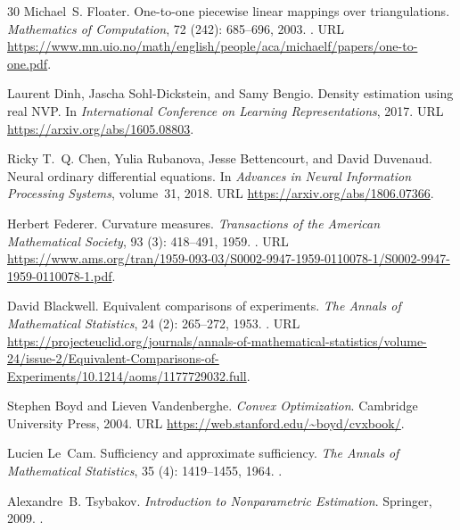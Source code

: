 \documentclass[11pt,a4paper]{article}
\numberwithin{equation}{section}
\theoremstyle{definition}
\begin{document}
\begin{thebibliography}{30}
Michael~S. Floater.
\newblock One-to-one piecewise linear mappings over triangulations.
\newblock \emph{Mathematics of Computation}, 72 (242):
  685--696, 2003.
\newblock {}.
\newblock URL
  \url{https://www.mn.uio.no/math/english/people/aca/michaelf/papers/one-to-one.pdf}.

Laurent Dinh, Jascha Sohl-Dickstein, and Samy Bengio.
\newblock Density estimation using real {NVP}.
\newblock In \emph{International Conference on Learning Representations}, 2017.
\newblock URL \url{https://arxiv.org/abs/1605.08803}.

Ricky T.~Q. Chen, Yulia Rubanova, Jesse Bettencourt, and David Duvenaud.
\newblock Neural ordinary differential equations.
\newblock In \emph{Advances in Neural Information Processing Systems},
  volume~31, 2018.
\newblock URL \url{https://arxiv.org/abs/1806.07366}.

Herbert Federer.
\newblock Curvature measures.
\newblock \emph{Transactions of the American Mathematical Society}, 93
  (3): 418--491, 1959.
\newblock {}.
\newblock URL
  \url{https://www.ams.org/tran/1959-093-03/S0002-9947-1959-0110078-1/S0002-9947-1959-0110078-1.pdf}.

David Blackwell.
\newblock Equivalent comparisons of experiments.
\newblock \emph{The Annals of Mathematical Statistics}, 24
  (2): 265--272, 1953.
\newblock {}.
\newblock URL
  \url{https://projecteuclid.org/journals/annals-of-mathematical-statistics/volume-24/issue-2/Equivalent-Comparisons-of-Experiments/10.1214/aoms/1177729032.full}.

Stephen Boyd and Lieven Vandenberghe.
\newblock \emph{Convex Optimization}.
\newblock Cambridge University Press, 2004.
\newblock URL \url{https://web.stanford.edu/~boyd/cvxbook/}.

Lucien Le~Cam.
\newblock Sufficiency and approximate sufficiency.
\newblock \emph{The Annals of Mathematical Statistics}, 35
  (4): 1419--1455, 1964.
\newblock {}.

Alexandre~B. Tsybakov.
\newblock \emph{Introduction to Nonparametric Estimation}.
\newblock Springer, 2009.
\newblock {}.


\end{thebibliography}
\end{document}
